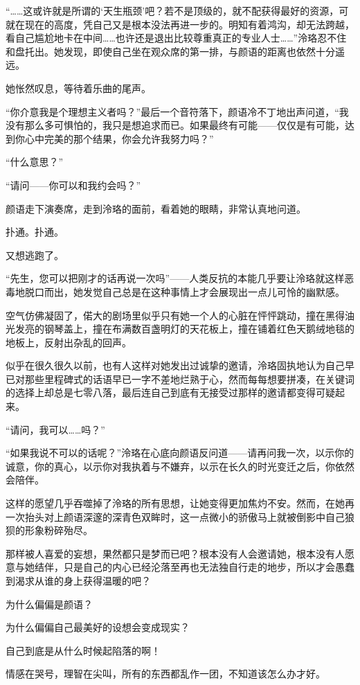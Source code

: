 \documentclass[UTF8, scheme = chinese, openany]{ctexbook}
\begin{document}
“……这或许就是所谓的‘天生瓶颈’吧？若不是顶级的，就不配获得最好的资源，可就在现在的高度，凭自己又是根本没法再进一步的。明知有着鸿沟，却无法跨越，看自己尴尬地卡在中间……也许还是退出比较尊重真正的专业人士……”泠珞忍不住和盘托出。她发现，即使自己坐在观众席的第一排，与颜语的距离也依然十分遥远。

她怅然叹息，等待着乐曲的尾声。

“你介意我是个理想主义者吗？”最后一个音符落下，颜语冷不丁地出声问道，“我没有那么多可惧怕的，我只是想追求而已。如果最终有可能——仅仅是有可能，达到你心中完美的那个结果，你会允许我努力吗？”

“什么意思？”

“请问——你可以和我约会吗？”

颜语走下演奏席，走到泠珞的面前，看着她的眼睛，非常认真地问道。

\vspace{1.5em}

扑通。扑通。

又想逃跑了。

“先生，您可以把刚才的话再说一次吗”——人类反抗的本能几乎要让泠珞就这样恶毒地脱口而出，她发觉自己总是在这种事情上才会展现出一点儿可怜的幽默感。

空气仿佛凝固了，偌大的剧场里似乎只有她一个人的心脏在怦怦跳动，撞在黑得油光发亮的钢琴盖上，撞在布满数百盏明灯的天花板上，撞在铺着红色天鹅绒地毯的地板上，反射出杂乱的回声。

似乎在很久很久以前，也有人这样对她发出过诚挚的邀请，泠珞固执地认为自己早已对那些里程碑式的话语早已一字不差地烂熟于心，然而每每想要拼凑，在关键词的选择上却总是七零八落，最后连自己到底有无接受过那样的邀请都变得可疑起来。

“请问，我可以……吗？”

“如果我说不可以的话呢？”泠珞在心底向颜语反问道——请再问我一次，以示你的诚意，你的真心，以示你对我执着与不嫌弃，以示在长久的时光变迁之后，你依然会陪伴。

这样的愿望几乎吞噬掉了泠珞的所有思想，让她变得更加焦灼不安。然而，在她再一次抬头对上颜语深邃的深青色双眸时，这一点微小的骄傲马上就被倒影中自己狼狈的形象粉碎殆尽。

那样被人喜爱的妄想，果然都只是梦而已吧？根本没有人会邀请她，根本没有人愿意与她结伴，只是自己的内心已经沦落至再也无法独自行走的地步，所以才会愚蠢到渴求从谁的身上获得温暖的吧？

为什么偏偏是颜语？

为什么偏偏自己最美好的设想会变成现实？

自己到底是从什么时候起陷落的啊！

情感在哭号，理智在尖叫，所有的东西都乱作一团，不知道该怎么办才好。
\end{document}
